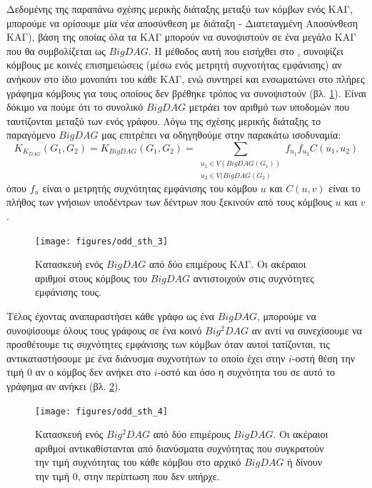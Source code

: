 Δεδομένης της παραπάνω σχέσης μερικής διάταξης μεταξύ των κόμβων ενός ΚΑΓ, μπορούμε να ορίσουμε μία νέα αποσύνθεση με διάταξη  - Διατεταγμένη Αποσύνθεση ΚΑΓ), βάση της οποίας όλα τα ΚΑΓ μπορούν να συνοψιστούν σε ένα μεγάλο ΚΑΓ που θα συμβολίζεται ως $BigDAG$.
Η μέθοδος αυτή που εισήχθει στο \cite[MinimalDAG:  2, p. 3]{Martino2006}, συνοψίζει κόμβους με κοινές επισημειώσεις (μέσω ενός μετρητή συχνοτήτας εμφάνισης) αν ανήκουν στο ίδιο μονοπάτι του κάθε ΚΑΓ, ενώ συντηρεί και ενσωματώνει στο πλήρες γράφημα κόμβους για τους οποίους δεν βρέθηκε τρόπος να συνοψιστούν  (βλ. \ref{fig:odd_sth_3}).
Είναι δόκιμο να πούμε ότι το συνολικό $BigDAG$ μετράει τον αριθμό των υποδομών που ταυτίζονται μεταξύ των  ενός γράφου.
Λόγω της σχέσης μερικής διάταξης το παραγόμενο $BigDAG$ μας επιτρέπει να οδηγηθούμε στην παρακάτω ισοδυναμία:
\begin{equation}
K_{K_{DAG}}(G_{1}, G_{2}) = K_{BigDAG}(G_{1}, G_{2}) = \sum_{\substack{u_{1} \in V(BigDAG(G_{1}))\\ u_{2} \in V(BigDAG(G_{2})}} f_{u_{1}}f_{u_{2}}C(u_{1}, u_{2})
\end{equation}
όπου $f_{u}$ είναι ο μετρητής συχνότητας εμφάνισης του κόμβου $u$ και $C(u, v)$ είναι το πλήθος των γνήσιων υποδέντρων των δέντρων που ξεκινούν από τους κόμβους $u$ και $v$.
\begin{figure}[]
\centering
\texttt{[image: figures/odd\_sth\_3]}
\caption{Κατασκευή ενός $BigDAG$ από δύο επιμέρους ΚΑΓ. Οι ακέραιοι αριθμοί στους κόμβους του $BigDAG$ αντιστοιχούν στις συχνότητες εμφάνισης τους.}
\label{fig:odd_sth_3}
\end{figure}

Τέλος έχοντας αναπαραστήσει κάθε γράφο ως ένα $BigDAG$, μπορούμε να συνοψίσουμε όλους τους γράφους σε ένα κοινό $Big^{2}DAG$ αν αντί να συνεχίσουμε να προσθέτουμε τις συχνότητες εμφάνισης των κόμβων όταν αυτοί τατίζονται, τις αντικαταστήσουμε με ένα διάνυσμα συχνοτήτων το οποίο έχει στην $i$-οστή θέση την τιμή $0$ αν ο κόμβος δεν ανήκει στο $i$-οστό και όσο η συχνότητα του σε αυτό το γράφημα αν ανήκει (βλ. \ref{fig:odd_sth_4}).
\begin{figure}[]
\centering
\texttt{[image: figures/odd\_sth\_4]}
\caption{Κατασκευή ενός $Big^{2}DAG$ από δύο επιμέρους $BigDAG$. Οι ακέραιοι αριθμοί αντικαθίστανται από διανύσματα συχνότητας που συγκρατούν την τιμή συχνότητας του κάθε κόμβου στο αρχικό $BigDAG$ ή δίνουν την τιμή $0$, στην περίπτωση που δεν υπήρχε.}
\label{fig:odd_sth_4}
\end{figure}

